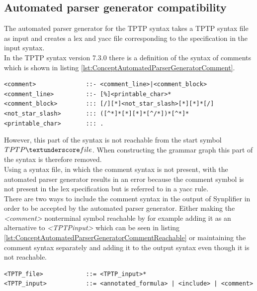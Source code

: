 \subsection{Automated parser generator compatibility}\label{sec:ConceptAutomatedParserGenerator}

The automated parser generator for the \ac{TPTP} syntax \cite{VS06} takes a \ac{TPTP} syntax file as input and creates a lex and yacc file corresponding to the specification in the input syntax.\\
In the \ac{TPTP} syntax version 7.3.0 there is a definition of the syntax of comments which is shown in listing \ref{lst:ConceptAutomatedParserGeneratorComment}.
\begin{lstlisting}[language=none, basicstyle=\scriptsize, caption=Comment syntax definition in the \ac{TPTP} syntax, label= lst:ConceptAutomatedParserGeneratorComment]
<comment>              ::- <comment_line>|<comment_block> 
<comment_line>         ::- [%]<printable_char>*
<comment_block>        ::: [/][*]<not_star_slash>[*][*]*[/]
<not_star_slash>       ::: ([^*]*[*][*]*[^/*])*[^*]*
<printable_char>       ::: .
\end{lstlisting}

However, this part of the syntax is not reachable from the start symbol $TPTP\textunderscore file$.
When constructing the grammar graph this part of the syntax is therefore removed.\\
Using a syntax file, in which the comment syntax is not present, with the automated parser generator results in an error because the comment symbol is not present in the lex specification but is referred to in a yacc rule.\\
There are two ways to include the comment syntax in the output of \ac{Synplifier} in order to be accepted by the automated parser generator.
Either making the \textit{<comment>} nonterminal symbol reachable by for example adding it as an alternative to \textit{<TPTP\textunderscore input>} which can be seen in listing \ref{lst:ConceptAutomatedParserGeneratorCommentReachable} or maintaining the comment syntax separately and adding it to the output syntax even though it is not reachable.
\begin{lstlisting}[language=none, basicstyle=\scriptsize, caption=Making the comment syntax reachable, label= lst:ConceptAutomatedParserGeneratorCommentReachable]
<TPTP_file>            ::= <TPTP_input>*
<TPTP_input>           ::= <annotated_formula> | <include> | <comment>
\end{lstlisting}

